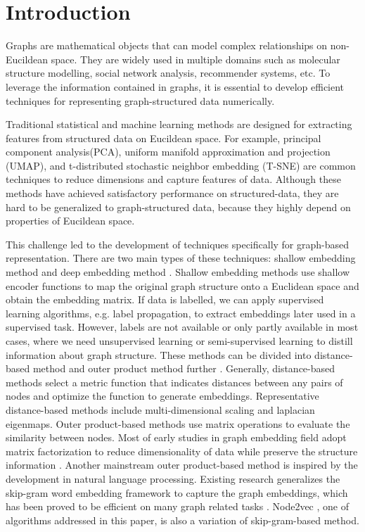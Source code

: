 \documentclass[sigconf]{acmart}
\begin{document}
\section{Introduction}
Graphs are mathematical objects that can model complex relationships on non-Eucildean space. They are widely used in multiple domains such as molecular structure modelling, social network analysis, recommender systems, etc. To leverage the information contained in graphs, it is essential to develop efficient techniques for representing graph-structured data numerically.\par
Traditional statistical and machine learning methods are designed for extracting features from structured data on Eucildean space. For example, principal component analysis(PCA), uniform manifold approximation and projection (UMAP), and t-distributed stochastic neighbor embedding (T-SNE) are common techniques to reduce dimensions and capture features of data. Although these methods have achieved satisfactory performance on structured-data, they are hard to be generalized to graph-structured data, because they highly depend on properties of Eucildean space.\par
This challenge led to the development of techniques specifically for graph-based representation. There are two main types of these techniques: shallow embedding method and deep embedding method \cite{murphy2022}. Shallow embedding methods use shallow encoder functions to map the original graph structure onto a Euclidean space and obtain the embedding matrix. If data is labelled, we can apply supervised learning algorithms, e.g. label propagation, to extract embeddings later used in a supervised task. However, labels are not available or only partly available in most cases, where we need unsupervised learning or semi-supervised learning to distill information about graph structure. These methods can be divided into distance-based method and outer product method further \cite{murphy2022}. Generally, distance-based methods select a metric function that indicates distances between any pairs of nodes and optimize the function to generate embeddings. Representative distance-based methods include multi-dimensional scaling and laplacian eigenmaps. Outer product-based methods use matrix operations to evaluate the similarity between nodes. Most of early studies in graph embedding field adopt matrix factorization to reduce dimensionality of data while preserve the structure information \cite{cai2018}. Another mainstream outer product-based method is inspired by the development in natural language processing. Existing research generalizes the skip-gram word embedding framework to capture the graph embeddings, which has been proved to be efficient on many graph related tasks \cite{deepwalk}\cite{line}. Node2vec \cite{node2vec}, one of algorithms addressed in this paper, is also a variation of skip-gram-based method.\par
\end{document}
